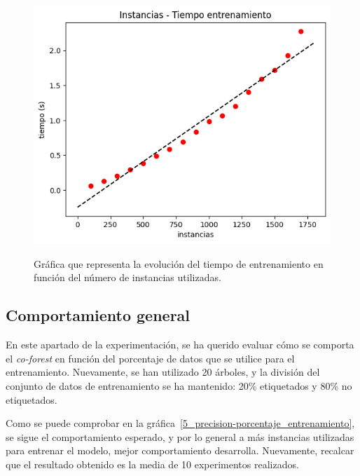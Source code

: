 \begin{figure}[h]
	\caption{Gráfica que representa la evolución del tiempo de entrenamiento en función del número de instancias utilizadas.}
	\centering
	\includegraphics[width=\textwidth]{../img/memoria/5_coforest_tiempo-instancias}
	\label{5_coforest_tiempo-instancias}
\end{figure}



\subsection{Comportamiento general}

En este apartado de la experimentación, se ha querido evaluar cómo se comporta el \textit{co-forest} en función del porcentaje de datos que se utilice para el entrenamiento. Nuevamente, se han utilizado 20 árboles, y la división del conjunto de datos de entrenamiento se ha mantenido: 20\% etiquetados y 80\% no etiquetados.

Como se puede comprobar en la gráfica~\ref{5_precision-porcentaje_entrenamiento}, se sigue el comportamiento esperado, y por lo general a más instancias utilizadas para entrenar el modelo, mejor comportamiento desarrolla. Nuevamente, recalcar que el resultado obtenido es la media de 10 experimentos realizados.

